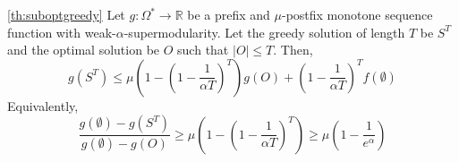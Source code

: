 \documentclass{article} %
\begin{document}
\begin{customtheorem}{\ref{th:suboptgreedy}}
    Let $g: \Omega^* \to \mathbb{R}$ be a prefix and $\mu$-postfix monotone sequence function with weak-$\alpha$-supermodularity. Let the greedy solution of length $T$ be $S^T$ and the optimal solution be $O$ such that $|O| \leq T$. Then,
    \begin{equation*}
        g(S^T) \leq  \mu\left(1 - \left(1 - \frac{1}{\alpha T}\right)^T\right)
        g(O) +  \left(1 - \frac{1}{\alpha T}\right)^Tf(\emptyset)
    \end{equation*}
    Equivalently, 
    \begin{equation*}
        \frac{g(\emptyset) - g(S^T)}{g(\emptyset) - g(O)} \geq \mu\left(1 - \left(1 - \frac{1}{\alpha T}\right)^T\right) \geq \mu\left(1 - \frac{1}{e^{\alpha}}\right)
    \end{equation*}
\end{customtheorem}
\end{document}
